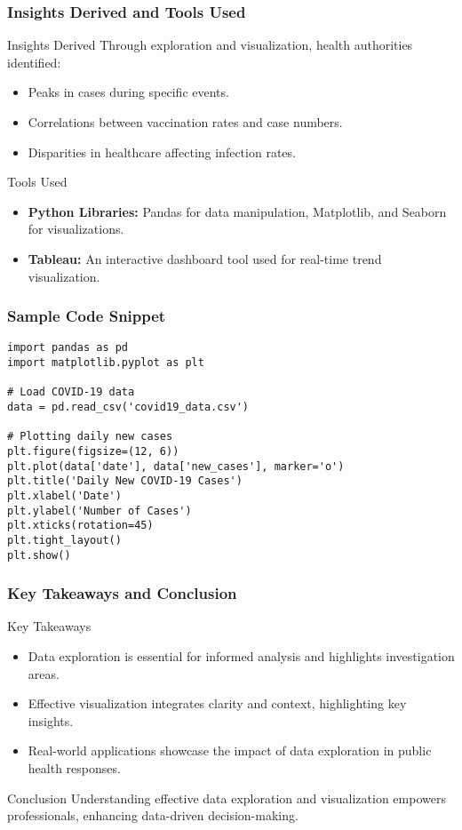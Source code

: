 \documentclass[aspectratio=169]{beamer}
\begin{document}
\begin{frame}
  \frametitle{Insights Derived and Tools Used}
  \begin{block}{Insights Derived}
    Through exploration and visualization, health authorities identified:
    \begin{itemize}
      \item Peaks in cases during specific events.
      \item Correlations between vaccination rates and case numbers.
      \item Disparities in healthcare affecting infection rates.
    \end{itemize}
  \end{block}

  \begin{block}{Tools Used}
    \begin{itemize}
      \item \textbf{Python Libraries:} Pandas for data manipulation, Matplotlib, and Seaborn for visualizations.
      \item \textbf{Tableau:} An interactive dashboard tool used for real-time trend visualization.
    \end{itemize}
  \end{block}
\end{frame}

\begin{frame}[fragile]
  \frametitle{Sample Code Snippet}
  \begin{lstlisting}
import pandas as pd
import matplotlib.pyplot as plt

# Load COVID-19 data
data = pd.read_csv('covid19_data.csv')

# Plotting daily new cases
plt.figure(figsize=(12, 6))
plt.plot(data['date'], data['new_cases'], marker='o')
plt.title('Daily New COVID-19 Cases')
plt.xlabel('Date')
plt.ylabel('Number of Cases')
plt.xticks(rotation=45)
plt.tight_layout()
plt.show()
  \end{lstlisting}
\end{frame}

\begin{frame}
  \frametitle{Key Takeaways and Conclusion}
  \begin{block}{Key Takeaways}
    \begin{itemize}
      \item Data exploration is essential for informed analysis and highlights investigation areas.
      \item Effective visualization integrates clarity and context, highlighting key insights.
      \item Real-world applications showcase the impact of data exploration in public health responses.
    \end{itemize}
  \end{block}

  \begin{block}{Conclusion}
    Understanding effective data exploration and visualization empowers professionals, enhancing data-driven decision-making.
  \end{block}
\end{frame}
\end{document}
